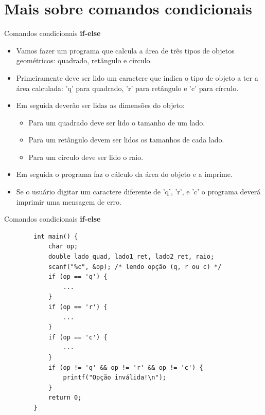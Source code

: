 \documentclass[handout]{beamer}
\begin{document}

\section{Mais sobre comandos condicionais}

\begin{frame}[fragile]{Comandos condicionais {\bf if-else}}

    \begin{itemize}[<+->]
        \item Vamos fazer um programa que calcula a área de três tipos de objetos geométricos: quadrado, retângulo e círculo.
        \item Primeiramente deve ser lido um caractere que indica o tipo de objeto a ter a área calculada: 'q' para quadrado, 'r' para retângulo e 'c' para círculo.
        \item Em seguida deverão ser lidas as dimensões do objeto:
        \begin{itemize}
            \item Para um quadrado deve ser lido o tamanho de um lado.
            \item Para um retângulo devem ser lidos os tamanhos de cada lado.
            \item Para um círculo deve ser lido o raio.
        \end{itemize}
        \item Em seguida o programa faz o cálculo da área do objeto e a imprime.
        \item Se o usuário digitar um caractere diferente de 'q', 'r', e 'c' o programa deverá imprimir uma mensagem de erro.
    \end{itemize}

\end{frame}

\begin{frame}[fragile]{Comandos condicionais {\bf if-else}}

    \begin{verbatim}
        int main() {
            char op;
            double lado_quad, lado1_ret, lado2_ret, raio;
            scanf("%c", &op); /* lendo opção (q, r ou c) */
            if (op == 'q') {
                ...
            }
            if (op == 'r') {
                ...
            }
            if (op == 'c') {
                ...
            }
            if (op != 'q' && op != 'r' && op != 'c') {
                printf("Opção inválida!\n");
            }
            return 0;
        }
    \end{verbatim}
\end{frame}
\end{document}
